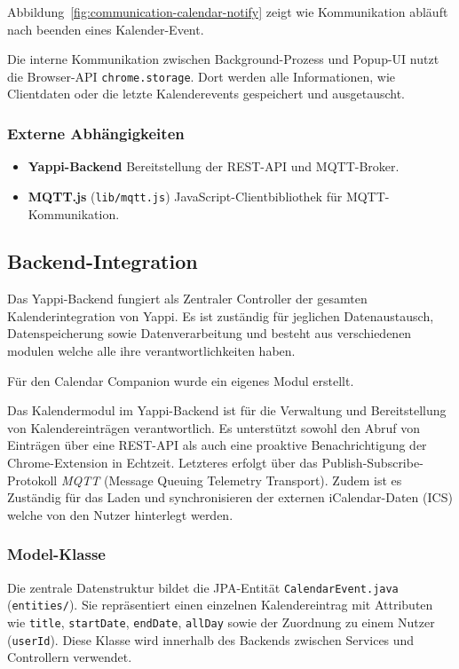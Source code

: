 \documentclass[12pt,a4paper]{report}
\begin{document}
        Abbildung~\ref{fig:communication-calendar-notify} zeigt wie Kommunikation abläuft nach beenden eines Kalender-Event.

        Die interne Kommunikation zwischen Background-Prozess und Popup-UI nutzt die Browser-API \texttt{chrome.storage}.
        Dort werden alle Informationen, wie Clientdaten oder die letzte Kalenderevents gespeichert und ausgetauscht.



    \subsubsection{Externe Abhängigkeiten}
        \begin{itemize}
          \item \textbf{Yappi-Backend} Bereitstellung der REST-API und MQTT-Broker.
          \item \textbf{MQTT.js} (\texttt{lib/mqtt.js}) JavaScript-Clientbibliothek für MQTT-Kommunikation.
        \end{itemize}

\subsection{Backend-Integration}

        Das Yappi-Backend fungiert als Zentraler Controller der gesamten Kalenderintegration von Yappi.
        Es ist zuständig für jeglichen Datenaustausch, Datenspeicherung sowie Datenverarbeitung und besteht
        aus verschiedenen modulen welche alle ihre verantwortlichkeiten haben.

        Für den Calendar Companion wurde ein eigenes Modul erstellt.

        Das Kalendermodul im Yappi-Backend ist für die Verwaltung und Bereitstellung von Kalendereinträgen verantwortlich.
        Es unterstützt sowohl den Abruf von Einträgen über eine REST-API als auch eine proaktive Benachrichtigung der Chrome-Extension in Echtzeit.
        Letzteres erfolgt über das Publish-Subscribe-Protokoll \textit{MQTT} (Message Queuing Telemetry Transport).
        Zudem ist es Zuständig für das Laden und synchronisieren der externen iCalendar-Daten (ICS) welche von den Nutzer hinterlegt werden.


    \subsubsection{Model-Klasse}
        Die zentrale Datenstruktur bildet die JPA-Entität \texttt{CalendarEvent.java} (\texttt{entities/}).
        Sie repräsentiert einen einzelnen Kalendereintrag mit Attributen wie \texttt{title}, \texttt{startDate}, \texttt{endDate}, \texttt{allDay} sowie der Zuordnung zu einem Nutzer (\texttt{userId}).
        Diese Klasse wird innerhalb des Backends zwischen Services und Controllern verwendet.
\end{document}
